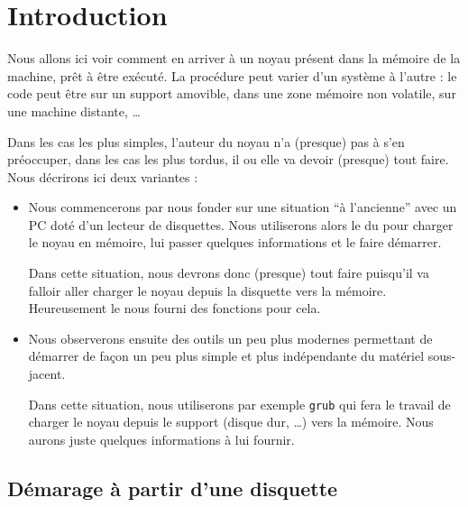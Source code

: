 \section{Introduction}

   Nous allons ici voir comment en arriver à un noyau présent dans la
mémoire de la machine, prêt à être exécuté. La procédure peut varier
d'un système à l'autre : le code peut être sur un support amovible,
dans une zone mémoire non volatile, sur une machine distante, \ldots


   Dans les cas les plus simples, l'auteur du noyau n'a (presque) pas
à s'en préoccuper, dans les cas les plus tordus, il ou elle va devoir
(presque) tout faire. Nous décrirons ici deux variantes :

\begin{itemize}
   \item Nous commencerons par nous fonder sur une situation ``à
     l'ancienne'' avec un PC doté d'un lecteur de
     disquettes. Nous utiliserons alors le \bios du \pc
     pour charger le noyau en mémoire, lui passer quelques
     informations et le faire démarrer.

     Dans cette situation, nous devrons donc (presque) tout faire
     puisqu'il va falloir aller charger le noyau depuis la disquette
     vers la mémoire. Heureusement le \bios nous fourni des fonctions
     pour cela.

   \item Nous observerons ensuite des outils un peu plus modernes
     permettant de démarrer de façon un peu plus simple et plus
     indépendante du matériel sous-jacent.

     Dans cette situation, nous utiliserons par exemple {\tt grub} qui fera
     le travail de charger le noyau depuis le support (disque dur,
     \ldots) vers la mémoire. Nous aurons juste quelques informations
     à lui fournir.
  
\end{itemize}

%
\subsection{Démarage à partir d'une disquette}

